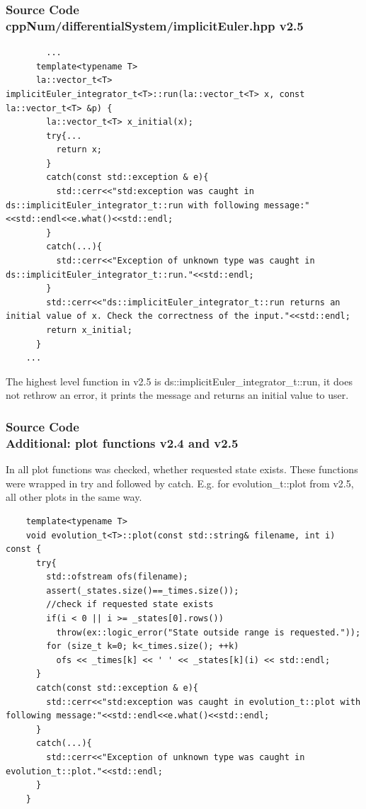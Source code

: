 \documentclass[ucs,10pt]{beamer}
\begin{document}
\begin{frame}[fragile]
\frametitle{Source Code \\
        \small \color{rwth-blue} cppNum/differentialSystem/implicitEuler.hpp v2.5 }
        \begin{lstlisting}
        ...
	  template<typename T>
	  la::vector_t<T> implicitEuler_integrator_t<T>::run(la::vector_t<T> x, const la::vector_t<T> &p) {
	    la::vector_t<T> x_initial(x);
	    try{...
	      return x;
	    }
	    catch(const std::exception & e){
	      std::cerr<<"std:exception was caught in ds::implicitEuler_integrator_t::run with following message:"<<std::endl<<e.what()<<std::endl;
	    }
	    catch(...){
	      std::cerr<<"Exception of unknown type was caught in ds::implicitEuler_integrator_t::run."<<std::endl;
	    }
	    std::cerr<<"ds::implicitEuler_integrator_t::run returns an initial value of x. Check the correctness of the input."<<std::endl;
	    return x_initial;
	  }
	...
        \end{lstlisting}
        The highest level function in v2.5 is ds::implicitEuler\_integrator\_t::run, it does not rethrow an error, it prints the message and returns an initial value to user.
\end{frame}

\begin{frame}[fragile]
\frametitle{Source Code \\
        \small \color{rwth-blue} Additional: plot functions v2.4 and v2.5 }
	In all plot functions was checked, whether requested state exists. These functions were wrapped in try and followed by catch. E.g. for evolution\_t::plot from v2.5, all other plots in the same way.
	\begin{lstlisting}
	template<typename T>
	void evolution_t<T>::plot(const std::string& filename, int i) const {
	  try{
	    std::ofstream ofs(filename);
	    assert(_states.size()==_times.size());
	    //check if requested state exists
	    if(i < 0 || i >= _states[0].rows())
	      throw(ex::logic_error("State outside range is requested."));
	    for (size_t k=0; k<_times.size(); ++k)
	      ofs << _times[k] << ' ' << _states[k](i) << std::endl;
	  }
	  catch(const std::exception & e){
	    std::cerr<<"std:exception was caught in evolution_t::plot with following message:"<<std::endl<<e.what()<<std::endl;
	  }
	  catch(...){
	    std::cerr<<"Exception of unknown type was caught in evolution_t::plot."<<std::endl;
	  }
	}
        \end{lstlisting}
\end{frame}
\end{document}

